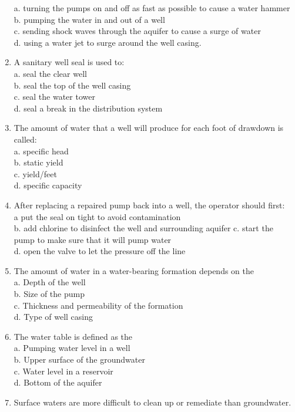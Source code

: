 \begin{enumerate}
a. turning the pumps on and off as fast as possible to cause a water hammer\\
b. pumping the water in and out of a well\\
c. sending shock waves through the aquifer to cause a surge of water\\
d. using a water jet to surge around the well casing.\\
\item A sanitary well seal is used to:\\
a. seal the clear well\\
b. seal the top of the well casing\\
c. seal the water tower\\
d. seal a break in the distribution system\\
\item The amount of water that a well will produce for each foot of drawdown is called:\\
a. specific head\\
b. static yield\\
c. yield/feet\\
d. specific capacity\\
\item After replacing a repaired pump back into a well, the operator should first:\\
a put the seal on tight to avoid contamination\\
b. add chlorine to disinfect the well and surrounding aquifer c. start the pump to make sure that it will pump water\\
d. open the valve to let the pressure off the line\\
\item The amount of water in a water-bearing formation depends on the\\
a. Depth of the well\\
b. Size of the pump\\
c. Thickness and permeability of the formation\\
d. Type of well casing
\item The water table is defined as the\\
a. Pumping water level in a well\\
b. Upper surface of the groundwater\\
c. Water level in a reservoir\\
d. Bottom of the aquifer\\
\item Surface waters are more difficult to clean up or remediate than groundwater.\\

\end{enumerate}
